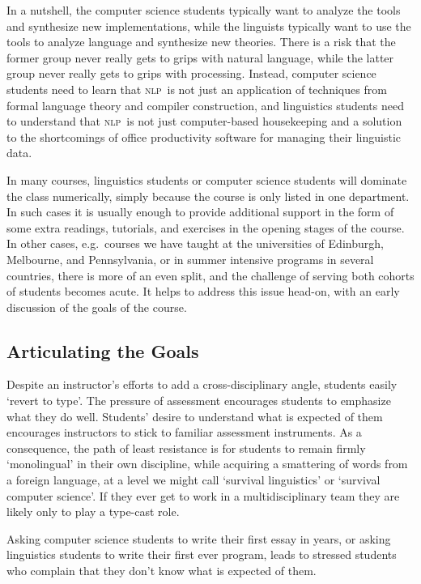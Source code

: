 \documentclass[11pt]{article}
\newcommand{\NLP}{\textsc{nlp}}
\begin{document}
In a nutshell, the computer science students typically want to analyze
the tools and synthesize new implementations, while the linguists
typically want to use the tools to analyze language and
synthesize new theories.  There is a risk that the former group
never really gets to grips with natural language, while the latter
group never really gets to grips with processing.  Instead,
computer science students need to learn that \NLP\ is not just an
application of techniques from formal language theory and compiler
construction, and linguistics students need to understand that \NLP\ is not
just computer-based housekeeping and a solution to the shortcomings of
office productivity software for managing their linguistic data.

In many courses, linguistics students or computer science students
will dominate the class numerically, simply because the course is only
listed in one department.  In such cases it is usually enough to
provide additional support in the form of some extra readings,
tutorials, and exercises in the opening stages of the course.  In
other cases, e.g.\ courses we have taught at the universities of Edinburgh,
Melbourne, and Pennsylvania, or in summer intensive programs in several countries, there
is more of an even split, and the challenge of serving both cohorts of
students becomes acute.  It helps to address this issue head-on, with
an early discussion of the goals of the course.

\subsection{Articulating the Goals}

Despite an instructor's efforts to add a cross-disciplinary angle, students
easily `revert to type'.  The pressure of assessment encourages students to emphasize
what they do well.  Students' desire to understand what is expected of them encourages
instructors to stick to familiar assessment instruments.  As a consequence,
the path of least resistance is for students to remain firmly
`monolingual' in their own discipline, while
acquiring a smattering of words from a foreign language, at a level we might
call `survival linguistics' or `survival computer science'.
If they ever get to work in a multidisciplinary team they are likely
only to play a type-cast role.

Asking computer science students to write their first essay in years,
or asking linguistics students to write their first ever program,
leads to stressed students who complain that they don't know what is
expected of them.
\end{document}
